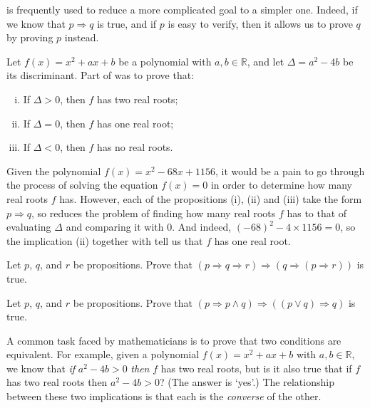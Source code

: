  is frequently used to reduce a more complicated goal to a simpler one. Indeed, if we know that $p \Rightarrow q$ is true, and if $p$ is easy to verify, then it allows us to prove $q$ by proving $p$ instead.

\begin{example}
Let $f(x) = x^2+ax+b$ be a polynomial with $a,b \in \mathbb{R}$, and let $\Delta = a^2-4b$ be its discriminant. Part of  was to prove that:
\begin{enumerate}[(i)]
\item If $\Delta > 0$, then $f$ has two real roots;
\item If $\Delta = 0$, then $f$ has one real root;
\item If $\Delta < 0$, then $f$ has no real roots.
\end{enumerate}
Given the polynomial $f(x) = x^2-68x+1156$, it would be a pain to go through the process of solving the equation $f(x)=0$ in order to determine how many real roots $f$ has. However, each of the propositions (i), (ii) and (iii) take the form $p \Rightarrow q$, so  reduces the problem of finding how many real roots $f$ has to that of evaluating $\Delta$ and comparing it with $0$. And indeed, $(-68)^2 - 4 \times 1156 = 0$, so the implication (ii) together with \elimrule{\Rightarrow} tell us that $f$ has one real root.
\end{example}

\begin{exercise}
Let $p$, $q$, and $r$ be propositions. Prove that $(p \Rightarrow q \Rightarrow r) \Rightarrow (q \Rightarrow (p \Rightarrow r))$ is true.
\end{exercise}

\begin{exercise}
Let $p$, $q$, and $r$ be propositions. Prove that $(p \Rightarrow p \wedge q) \Rightarrow ((p \vee q) \Rightarrow q)$ is true.
\end{exercise}


A common task faced by mathematicians is to prove that two conditions are equivalent. For example, given a polynomial $f(x) = x^2+ax+b$ with $a,b \in \mathbb{R}$, we know that \textit{if} $a^2-4b>0$ \textit{then} $f$ has two real roots, but is it also true that if $f$ has two real roots then $a^2-4b>0$? (The answer is `yes'.) The relationship between these two implications is that each is the \textit{converse} of the other.

